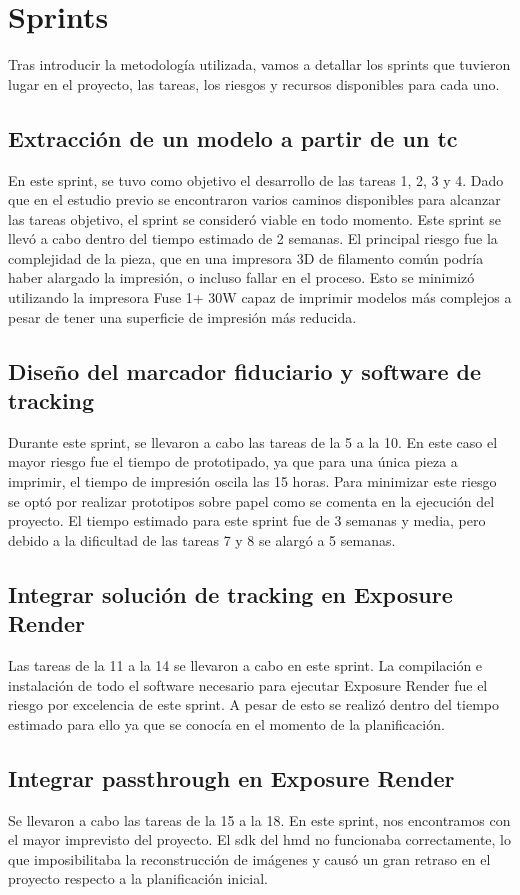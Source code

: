 \section{Sprints}
Tras introducir la metodología utilizada, vamos a detallar los sprints que tuvieron lugar en el proyecto, las tareas, los riesgos y recursos disponibles para cada uno.
\subsection{Extracción de un modelo a partir de un \acrshort{tc}}
En este sprint, se tuvo como objetivo el desarrollo de las tareas 1, 2, 3 y 4. Dado que en el estudio previo se encontraron varios caminos disponibles para alcanzar las tareas objetivo, el sprint se consideró viable en todo momento. Este sprint se llevó a cabo dentro del tiempo estimado de 2 semanas. El principal riesgo fue la complejidad de la pieza, que en una impresora 3D de filamento común podría haber alargado la impresión, o incluso fallar en el proceso. Esto se minimizó utilizando la impresora Fuse 1+ 30W capaz de imprimir modelos más complejos a pesar de tener una superficie de impresión más reducida.

\subsection{Diseño del marcador fiduciario y software de tracking}
Durante este sprint, se llevaron a cabo las tareas de la 5 a la 10. En este caso el mayor riesgo fue el tiempo de prototipado, ya que para una única pieza a imprimir, el tiempo de impresión oscila las 15 horas. Para minimizar este riesgo se optó por realizar prototipos sobre papel como se comenta en la ejecución del proyecto. El tiempo estimado para este sprint fue de 3 semanas y media, pero debido a la dificultad de las tareas 7 y 8 se alargó a 5 semanas.

\subsection{Integrar solución de tracking en Exposure Render}
Las tareas de la 11 a la 14 se llevaron a cabo en este sprint. La compilación e instalación de todo el software necesario para ejecutar Exposure Render fue el riesgo por excelencia de este sprint. A pesar de esto se realizó dentro del tiempo estimado para ello ya que se conocía en el momento de la planificación.

\subsection{Integrar passthrough en Exposure Render}
Se llevaron a cabo las tareas de la 15 a la 18. En este sprint, nos encontramos con el mayor imprevisto del proyecto. El \acrshort{sdk} del \acrshort{hmd} no funcionaba correctamente, lo que imposibilitaba la reconstrucción de imágenes y causó un gran retraso en el proyecto respecto a la planificación inicial.


